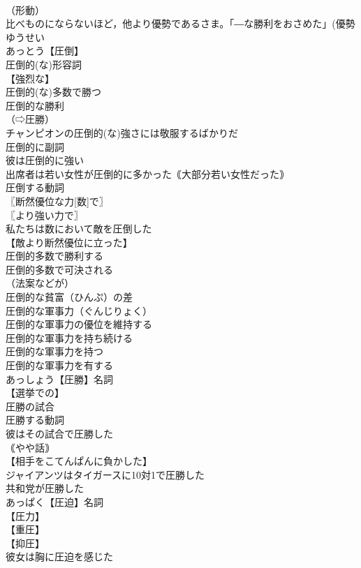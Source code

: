 \documentclass[8pt]{extreport}
\begin{document}
\begin{CJK}{UTF8}{min}
\\	（形動）
\\	比べものにならないほど，他より優勢であるさま。「―な勝利をおさめた」(優勢　ゆうせい 
\\	あっとう【圧倒】
\\	圧倒的(な)形容詞
\\	【強烈な】
\\	圧倒的(な)多数で勝つ
\\	圧倒的な勝利
\\	（⇨圧勝）
\\	チャンピオンの圧倒的(な)強さには敬服するばかりだ
\\	圧倒的に副詞
\\	彼は圧倒的に強い
\\	出席者は若い女性が圧倒的に多かった｟大部分若い女性だった｠
\\	圧倒する動詞
\\	〖断然優位な力[数]で〗
\\	〖より強い力で〗
\\	私たちは数において敵を圧倒した
\\	【敵より断然優位に立った】
\\	圧倒的多数で勝利する
\\	圧倒的多数で可決される
\\	（法案などが）
\\	圧倒的な貧富（ひんぷ）の差
\\	圧倒的な軍事力（ぐんじりょく）
\\	圧倒的な軍事力の優位を維持する
\\	圧倒的な軍事力を持ち続ける
\\	圧倒的な軍事力を持つ
\\	圧倒的な軍事力を有する
\\	あっしょう【圧勝】名詞
\\	【選挙での】
\\	圧勝の試合
\\	圧勝する動詞
\\	彼はその試合で圧勝した
\\	｟やや話｠
\\	【相手をこてんぱんに負かした】
\\	ジャイアンツはタイガースに10対1で圧勝した
\\	共和党が圧勝した
\\	あっぱく【圧迫】名詞
\\	【圧力】
\\	【重圧】
\\	【抑圧】
\\	彼女は胸に圧迫を感じた

\end{CJK}
\end{document}
